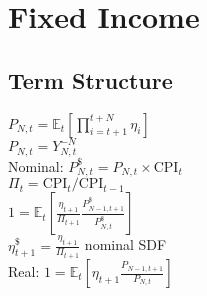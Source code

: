 \section{Fixed Income}
	\subsection*{Term Structure}
	$P_{N,t} = \mathbb{E}_{t}\left[\prod_{i = t + 1}^{t + N}\eta_{i}\right]$\\
	$P_{N,t} = Y_{N,t}^{-N}$\\
	Nominal: $P_{N,t}^{\$} = P_{N,t}\times\text{CPI}_{t}$\\
	$\Pi_{t} = \text{CPI}_{t}/\text{CPI}_{t - 1}$\\
	$1 = \mathbb{E}_{t}\left[\frac{\eta_{t + 1}}{\Pi_{t + 1}}\frac{P_{N-1,t+1}^{\$}}{P_{N,t}^{\$}}\right]$\\
	$\eta_{t+1}^{\$} = \frac{\eta_{t + 1}}{\Pi_{t + 1}}$ nominal SDF\\
	Real: $1 = \mathbb{E}_{t}\left[\eta_{t+1}\frac{P_{N-1,t+1}}{P_{N,t}}\right]$
	